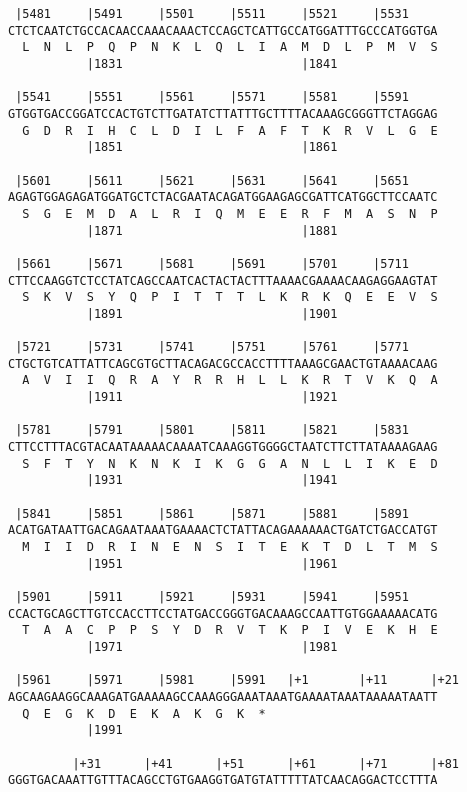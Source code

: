 \documentclass{article}
\begin{document}
\begin{Verbatim}
 |5481     |5491     |5501     |5511     |5521     |5531    
CTCTCAATCTGCCACAACCAAACAAACTCCAGCTCATTGCCATGGATTTGCCCATGGTGA
  L  N  L  P  Q  P  N  K  L  Q  L  I  A  M  D  L  P  M  V  S
           |1831                         |1841              
  
 |5541     |5551     |5561     |5571     |5581     |5591    
GTGGTGACCGGATCCACTGTCTTGATATCTTATTTGCTTTTACAAAGCGGGTTCTAGGAG
  G  D  R  I  H  C  L  D  I  L  F  A  F  T  K  R  V  L  G  E
           |1851                         |1861              
  
 |5601     |5611     |5621     |5631     |5641     |5651    
AGAGTGGAGAGATGGATGCTCTACGAATACAGATGGAAGAGCGATTCATGGCTTCCAATC
  S  G  E  M  D  A  L  R  I  Q  M  E  E  R  F  M  A  S  N  P
           |1871                         |1881              
  
 |5661     |5671     |5681     |5691     |5701     |5711    
CTTCCAAGGTCTCCTATCAGCCAATCACTACTACTTTAAAACGAAAACAAGAGGAAGTAT
  S  K  V  S  Y  Q  P  I  T  T  T  L  K  R  K  Q  E  E  V  S
           |1891                         |1901              
  
 |5721     |5731     |5741     |5751     |5761     |5771    
CTGCTGTCATTATTCAGCGTGCTTACAGACGCCACCTTTTAAAGCGAACTGTAAAACAAG
  A  V  I  I  Q  R  A  Y  R  R  H  L  L  K  R  T  V  K  Q  A
           |1911                         |1921              
  
 |5781     |5791     |5801     |5811     |5821     |5831    
CTTCCTTTACGTACAATAAAAACAAAATCAAAGGTGGGGCTAATCTTCTTATAAAAGAAG
  S  F  T  Y  N  K  N  K  I  K  G  G  A  N  L  L  I  K  E  D
           |1931                         |1941              
  
 |5841     |5851     |5861     |5871     |5881     |5891    
ACATGATAATTGACAGAATAAATGAAAACTCTATTACAGAAAAAACTGATCTGACCATGT
  M  I  I  D  R  I  N  E  N  S  I  T  E  K  T  D  L  T  M  S
           |1951                         |1961              
  
 |5901     |5911     |5921     |5931     |5941     |5951    
CCACTGCAGCTTGTCCACCTTCCTATGACCGGGTGACAAAGCCAATTGTGGAAAAACATG
  T  A  A  C  P  P  S  Y  D  R  V  T  K  P  I  V  E  K  H  E
           |1971                         |1981              
  
 |5961     |5971     |5981     |5991   |+1       |+11      |+21
AGCAAGAAGGCAAAGATGAAAAAGCCAAAGGGAAATAAATGAAAATAAATAAAAATAATT
  Q  E  G  K  D  E  K  A  K  G  K  *   
           |1991                                            
  
         |+31      |+41      |+51      |+61      |+71      |+81
GGGTGACAAATTGTTTACAGCCTGTGAAGGTGATGTATTTTTATCAACAGGACTCCTTTA
                                                            

\end{Verbatim}
\end{document}
